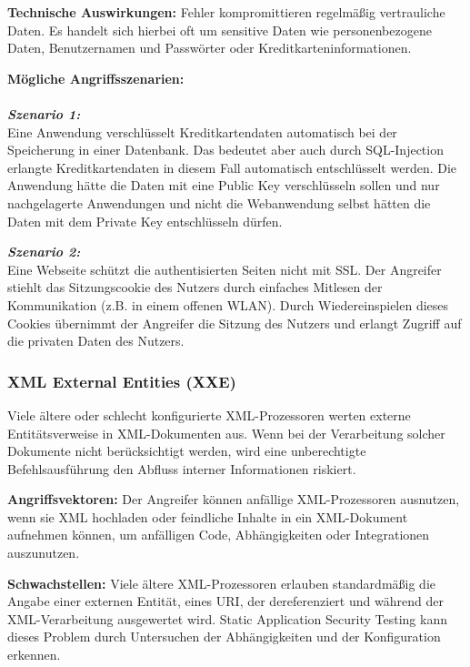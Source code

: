 \textbf{Technische Auswirkungen:} Fehler kompromittieren regelmäßig vertrauliche Daten. Es handelt sich hierbei oft um sensitive Daten wie personenbezogene Daten, Benutzernamen
und Passwörter oder Kreditkarteninformationen\cite[9]{owasp17top10}.

\textbf{Mögliche Angriffsszenarien:}\\
\\
\textbf{\textit{Szenario 1:}}\\
Eine Anwendung verschlüsselt Kreditkartendaten
automatisch bei der Speicherung in einer Datenbank. Das
bedeutet aber auch durch SQL-Injection erlangte Kreditkartendaten
in diesem Fall automatisch entschlüsselt werden.
Die Anwendung hätte die Daten mit eine Public Key
verschlüsseln sollen und nur nachgelagerte Anwendungen
und nicht die Webanwendung selbst hätten die Daten mit
dem Private Key entschlüsseln dürfen\cite[9]{owasp17top10}.

\textbf{\textit{Szenario 2:}}\\
Eine Webseite schützt die authentisierten Seiten
nicht mit SSL. Der Angreifer stiehlt das Sitzungscookie des
Nutzers durch einfaches Mitlesen der Kommunikation (z.B. in
einem offenen WLAN). Durch Wiedereinspielen dieses
Cookies übernimmt der Angreifer die Sitzung des Nutzers und
erlangt Zugriff auf die privaten Daten des Nutzers\cite[9]{owasp17top10}.

\subsubsection{XML External Entities (XXE)}
Viele ältere oder schlecht konfigurierte XML-Prozessoren werten externe Entitätsverweise in XML-Dokumenten aus. Wenn bei der Verarbeitung solcher Dokumente nicht berücksichtigt werden, wird eine unberechtigte Befehlsausführung den Abfluss interner Informationen riskiert\cite[6]{owasp17top10}.

\textbf{Angriffsvektoren:} Der Angreifer können anfällige XML-Prozessoren ausnutzen, wenn sie XML hochladen oder feindliche Inhalte in ein XML-Dokument aufnehmen können, um anfälligen Code, Abhängigkeiten oder Integrationen auszunutzen\cite[10]{owasp17top10}.

\textbf{Schwachstellen:} Viele ältere XML-Prozessoren erlauben standardmäßig die Angabe einer externen Entität, eines URI, der dereferenziert und während der XML-Verarbeitung ausgewertet wird. Static Application Security Testing kann dieses Problem durch Untersuchen der Abhängigkeiten und der Konfiguration erkennen\cite[10]{owasp17top10}.

